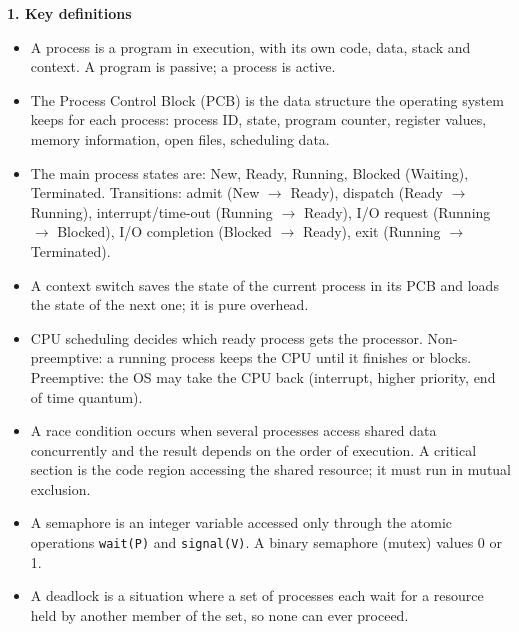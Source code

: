 \documentclass[11pt]{article}
\newcommand{\cle}[1]{{\popxbold\color{popdark}#1}}
\begin{document}
\begin{bilan}

\textbf{1. Key definitions}
\begin{itemize}
\item A \cle{process} is a program in execution, with its own code, data, stack and context. A program is passive; a process is active.
\item The \cle{Process Control Block} (PCB) is the data structure the operating system keeps for each process: process ID, state, program counter, register values, memory information, open files, scheduling data.
\item The main \cle{process states} are: New, Ready, Running, Blocked (Waiting), Terminated. Transitions: admit (New $\to$ Ready), dispatch (Ready $\to$ Running), interrupt/time-out (Running $\to$ Ready), I/O request (Running $\to$ Blocked), I/O completion (Blocked $\to$ Ready), exit (Running $\to$ Terminated).
\item A \cle{context switch} saves the state of the current process in its PCB and loads the state of the next one; it is pure overhead.
\item \cle{CPU scheduling} decides which ready process gets the processor. \cle{Non-preemptive}: a running process keeps the CPU until it finishes or blocks. \cle{Preemptive}: the OS may take the CPU back (interrupt, higher priority, end of time quantum).
\item A \cle{race condition} occurs when several processes access shared data concurrently and the result depends on the order of execution. A \cle{critical section} is the code region accessing the shared resource; it must run in \cle{mutual exclusion}.
\item A \cle{semaphore} is an integer variable accessed only through the atomic operations \texttt{wait(P)} and \texttt{signal(V)}. A binary semaphore (mutex) values 0 or 1.
\item A \cle{deadlock} is a situation where a set of processes each wait for a resource held by another member of the set, so none can ever proceed.
\end{itemize}


\end{bilan}
\end{document}

